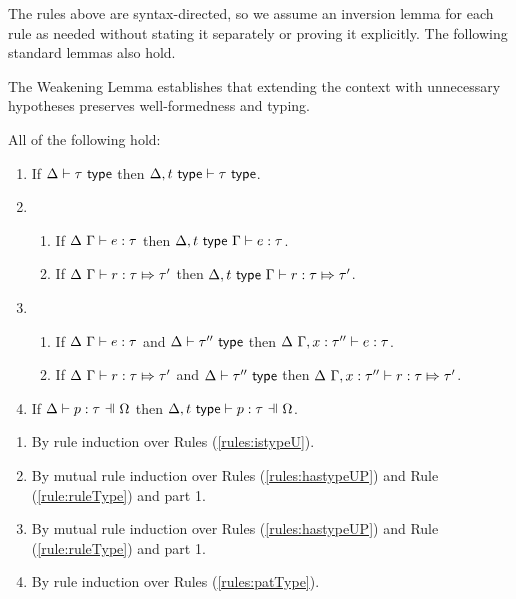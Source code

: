 {{{{The rules above are syntax-directed, so we assume an inversion lemma for each rule as needed without stating it separately or proving it explicitly. The following standard lemmas also hold.

The Weakening Lemma establishes that extending the context with unnecessary hypotheses preserves well-formedness and typing.
\begin{lemma}[Weakening]\label{lemma:weakening-UP} All of the following hold: 
\begin{enumerate} 
\item If $\Delta \vdash \tau~\mathsf{type}$ then $\Delta, t~\mathsf{type} \vdash \tau~\mathsf{type}$.
\item \begin{enumerate}
  \item If $\Delta~\Gamma \vdash e : \tau$ then $\Delta, t~\mathsf{type}~\Gamma \vdash e : \tau$.
  \item If $\Delta~\Gamma \vdash r : \tau \Mapsto \tau'$ then $\Delta, t~\mathsf{type}~\Gamma \vdash r : \tau \Mapsto \tau'$.
  \end{enumerate}
\item \begin{enumerate}
  \item If $\Delta~\Gamma \vdash e : \tau$ and $\Delta \vdash \tau''~\mathsf{type}$ then $\Delta~\Gamma, x : \tau'' \vdash e : \tau$.
  \item If $\Delta~\Gamma \vdash r : \tau \Mapsto \tau'$ and $\Delta \vdash \tau''~\mathsf{type}$ then $\Delta~\Gamma, x : \tau'' \vdash r : \tau \Mapsto \tau'$.
  \end{enumerate}
\item If $\patType{\pctx}{p}{\tau}$ then $\patTypeD{\Delta, \Dhyp{t}}{\pctx}{p}{\tau}$.
\end{enumerate}
\end{lemma}
\begin{proof-sketch}
\begin{enumerate}
\item By rule induction over Rules (\ref{rules:istypeU}).
\item By mutual rule induction over Rules (\ref{rules:hastypeUP}) and Rule (\ref{rule:ruleType}) and part 1.
\item By mutual rule induction over Rules (\ref{rules:hastypeUP}) and Rule (\ref{rule:ruleType}) and part 1.
\item By rule induction over Rules (\ref{rules:patType}).
\end{enumerate}
\end{proof-sketch}

}}}}
